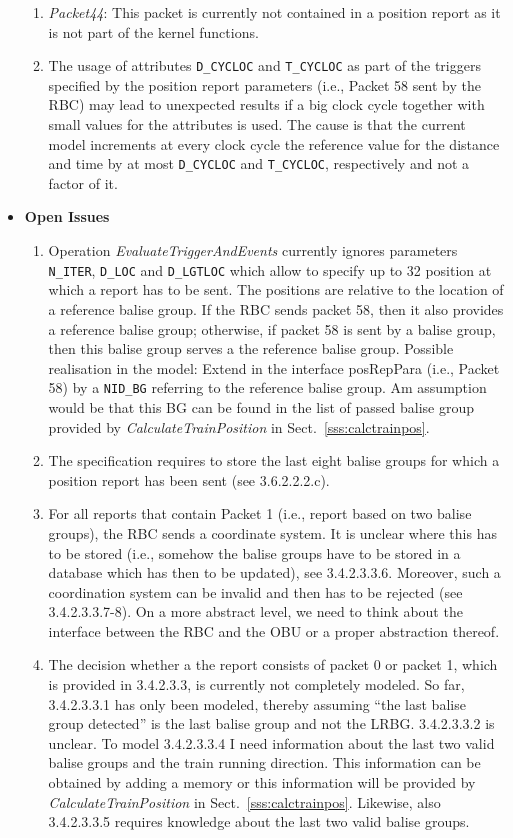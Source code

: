 \begin{itemize}
\begin{enumerate}
	\item \textit{Packet44}: This packet is currently not contained in a position report as it is not part of the kernel functions.
	\item The usage of attributes \verb+D_CYCLOC+ and \verb+T_CYCLOC+ as part of the triggers specified by the position report parameters (i.e., Packet 58 sent by the RBC) may lead to unexpected results if a big clock cycle together with small values for the attributes is used. The cause is that the current model increments at every clock cycle the reference value for the distance and time by at most \verb+D_CYCLOC+ and \verb+T_CYCLOC+, respectively and not a factor of it.
\end{enumerate}
\item \textbf{Open Issues}
\begin{enumerate}
	\item Operation \textit{EvaluateTriggerAndEvents} currently ignores parameters \verb+N_ITER+, \verb+D_LOC+ and \verb+D_LGTLOC+ which allow to specify up to 32 position at which a report has to be sent. The positions are relative to the location of a reference balise group. If the RBC sends packet 58, then it also provides a reference balise group; otherwise, if packet 58 is sent by a balise group, then this balise group serves a the reference balise group. Possible realisation in the model: Extend in the interface posRepPara (i.e., Packet 58) by a \verb+NID_BG+ referring to the reference balise group. Am assumption would be that this BG can be found in the list of passed balise group provided by \textit{CalculateTrainPosition} in Sect.~\ref{sss:calctrainpos}.
	\item The specification requires to store the last eight balise groups for which a position report has been sent (see 3.6.2.2.2.c).
	\item For all reports that contain Packet 1 (i.e., report based on two balise groups), the RBC sends a coordinate system. It is unclear where this has to be stored (i.e., somehow the balise groups have to be stored in a database which has then to be updated), see 3.4.2.3.3.6. Moreover, such a coordination system can be invalid and then has to be rejected (see 3.4.2.3.3.7-8). On a more abstract level, we need to think about the interface between the RBC and the OBU or a proper abstraction thereof.
	\item The decision whether a the report consists of packet 0 or packet 1, which is provided in 3.4.2.3.3, is currently not completely modeled. So far, 3.4.2.3.3.1 has only been modeled, thereby assuming ``the last balise group detected'' is the last balise group and not the LRBG. 3.4.2.3.3.2 is unclear. To model 3.4.2.3.3.4 I need information about the last two valid balise groups and the train running direction. This information can be obtained by adding a memory or this information will be provided by \textit{CalculateTrainPosition} in Sect.~\ref{sss:calctrainpos}. Likewise, also 3.4.2.3.3.5 requires knowledge about the last two valid balise groups.
\end{enumerate}
\end{itemize}
